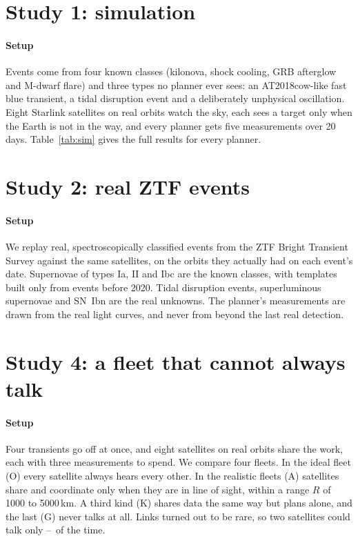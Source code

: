 \documentclass[final,5p,times,twocolumn,authoryear]{elsarticle}
\begin{document}
\section{Study 1: simulation}\label{sec:sim}
\paragraph{Setup} Events come from four known classes (kilonova, shock cooling, GRB afterglow and M-dwarf flare) and three types no planner ever sees: an AT2018cow-like fast blue transient, a tidal disruption event and a deliberately unphysical oscillation. Eight Starlink satellites on real orbits watch the sky, each sees a target only when the Earth is not in the way, and every planner gets five measurements over 20 days. Table~\ref{tab:sim} gives the full results for every planner.



\section{Study 2: real ZTF events}\label{sec:real}
\paragraph{Setup} We replay real, spectroscopically classified events from the ZTF Bright Transient Survey \citep{Fremling2020,Perley2020} against the same satellites, on the orbits they actually had on each event's date. Supernovae of types Ia, II and Ibc are the known classes, with templates built only from events before 2020. Tidal disruption events, superluminous supernovae and SN~Ibn are the real unknowns. The planner's measurements are drawn from the real light curves, and never from beyond the last real detection.





\section{Study 4: a fleet that cannot always talk}\label{sec:fleet}

\paragraph{Setup} Four transients go off at once, and eight satellites on real orbits share the work, each with three measurements to spend. We compare four fleets. In the ideal fleet (O) every satellite always hears every other. In the realistic fleets (A) satellites share and coordinate only when they are in line of sight, within a range $R$ of 1000 to 5000\,km. A third kind (K) shares data the same way but plans alone, and the last (G) never talks at all. Links turned out to be rare, so two satellites could talk only \FleetLinkUpOne--\FleetLinkUpFive\ of the time.
\end{document}
